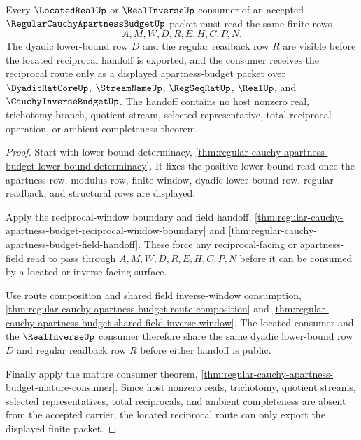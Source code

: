 \begin{theorem}
\label{thm:regular-cauchy-apartness-budget-located-reciprocal-handoff}
Every $\LocatedRealUp$ or $\RealInverseUp$ consumer of an accepted $\RegularCauchyApartnessBudgetUp$ packet must read the same finite rows
$$
A,M,W,D,R,E,H,C,P,N .
$$
The dyadic lower-bound row $D$ and the regular readback row $R$ are visible before the located reciprocal handoff is exported, and the consumer receives the reciprocal route only as a displayed apartness-budget packet over $\DyadicRatCoreUp$, $\StreamNameUp$, $\RegSeqRatUp$, $\RealUp$, and $\CauchyInverseBudgetUp$. The handoff contains no host nonzero real, trichotomy branch, quotient stream, selected representative, total reciprocal operation, or ambient completeness theorem.
\end{theorem}
\begin{proof}
Start with lower-bound determinacy, \autoref{thm:regular-cauchy-apartness-budget-lower-bound-determinacy}. It fixes the positive lower-bound read once the apartness row, modulus row, finite window, dyadic lower-bound row, regular readback, and structural rows are displayed.

Apply the reciprocal-window boundary and field handoff, \autoref{thm:regular-cauchy-apartness-budget-reciprocal-window-boundary} and \autoref{thm:regular-cauchy-apartness-budget-field-handoff}. These force any reciprocal-facing or apartness-field read to pass through $A,M,W,D,R,E,H,C,P,N$ before it can be consumed by a located or inverse-facing surface.

Use route composition and shared field inverse-window consumption, \autoref{thm:regular-cauchy-apartness-budget-route-composition} and \autoref{thm:regular-cauchy-apartness-budget-shared-field-inverse-window}. The located consumer and the $\RealInverseUp$ consumer therefore share the same dyadic lower-bound row $D$ and regular readback row $R$ before either handoff is public.

Finally apply the mature consumer theorem, \autoref{thm:regular-cauchy-apartness-budget-mature-consumer}. Since host nonzero reals, trichotomy, quotient streams, selected representatives, total reciprocals, and ambient completeness are absent from the accepted carrier, the located reciprocal route can only export the displayed finite packet.
\end{proof}

